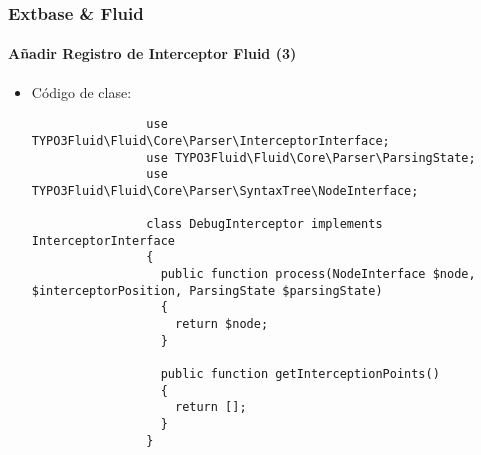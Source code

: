 \begin{frame}[fragile]
	\frametitle{Extbase \& Fluid}
	\framesubtitle{Añadir Registro de Interceptor Fluid (3)}

	\lstset{basicstyle=\tiny\ttfamily}

	\begin{itemize}

		\item Código de clase:

			\begin{lstlisting}
				use TYPO3Fluid\Fluid\Core\Parser\InterceptorInterface;
				use TYPO3Fluid\Fluid\Core\Parser\ParsingState;
				use TYPO3Fluid\Fluid\Core\Parser\SyntaxTree\NodeInterface;

				class DebugInterceptor implements InterceptorInterface
				{
				  public function process(NodeInterface $node, $interceptorPosition, ParsingState $parsingState)
				  {
				    return $node;
				  }

				  public function getInterceptionPoints()
				  {
				    return [];
				  }
				}
			\end{lstlisting}

	\end{itemize}

\end{frame}

